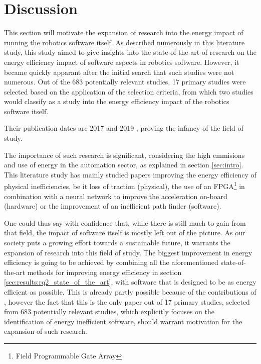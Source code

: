 \section{Discussion}
\label{sec:discussion}
This section will motivate the expansion of research into the energy impact of running the robotics software itself.
As described numerously in this literature study, this study aimed to give insights into the state-of-the-art of research
on the energy efficiency impact of software aspects in robotics software.
However, it became quickly apparant after the initial search that such studies were not numerous.
Out of the 683 potentially relevant studies, 17 primary studies were selected based on the application of the selection criteria, 
from which two studies would classify as a study into the energy efficiency impact of the robotics software itself.

Their publication dates are 2017 \cite{hou2017novel_cloud_evaluation_model} and 2019 \cite{rahman2019cloud_robot_offloading}, 
proving the infancy of the field of study.

The importance of such research is significant, considering the high emmisions and use of energy in the automation sector, as explained
in section \ref{sec:intro}.
This literature study has mainly studied papers improving the energy efficiency of physical inefficiencies, 
be it loss of traction (physical), the use of an FPGA\footnote{Field Programmable Gate Array} in combination with a neural network
to improve the acceleration on-board (hardware) or the improvement of an inefficient path finder (software).

One could thus say with confidence that, while there is still much to gain from that field, the impact of software itself is mostly left out
of the picture. 
As our society puts a growing effort towards a sustainable future, it warrants the expansion of research into this field of study.
The biggest improvement in energy efficiency is going to be achieved by combining all the aforementioned state-of-the-art methods for improving 
energy efficiency in section \ref{sec:results:rq2_state_of_the_art}, with software that is designed to be as energy efficient as possible.
This is already partly possible because of the contributions of \cite{hou2017novel_cloud_evaluation_model}, however the fact that this is the only paper
out of 17 primary studies, selected from 683 potentially relevant studies, which explicitly focuses on the identification of energy inefficient software, should warrant motivation for
the expansion of such research.